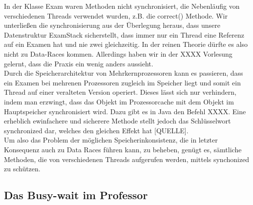 \documentclass[12pt,a4paper]{article}
\begin{document}
In der Klasse Exam waren Methoden nicht synchronisiert, die Nebenläufig von verschiedenen Threads verwendet wurden, z.B. die correct() Methode. Wir unterließen die synchronisierung aus der Überlegung heraus, dass unsere Datenstruktur ExamStack sicherstellt, dass immer nur ein Thread eine Referenz auf ein Examen hat und nie zwei gleichzeitig. In der reinen Theorie dürfte es also nicht zu Data-Races kommen. Allerdings haben wir in der XXXX Vorlesung gelernt, dass die Praxis ein wenig anders aussieht. \\Durch die Speicherarchitektur von Mehrkernprozessoren kann es passieren, dass ein Examen bei mehrenen Prozessoren zugleich im Speicher liegt und somit ein Thread auf einer veralteten Version operiert. Dieses lässt sich nur verhindern, indem man erzwingt, dass das Objekt im Prozessorcache mit dem Objekt im Hauptspeicher synchronisiert wird. Dazu gibt es in Java den Befehl XXXX. Eine erheblich ewinfachere und sicherere Methode stellt jedoch das Schlüsselwort synchronized dar, welches den gleichen Effekt hat [QUELLE].\\
Um also das Problem der möglichen Speicherinkonsistenz, die in letzter Konsequenz auch zu Data Races führen kann, zu beheben, genügt es, sämtliche Methoden, die von verschiedenen Threads aufgerufen werden, mittels synchonized zu schützen.

\subsection{Das Busy-wait im Professor}
\end{document}
